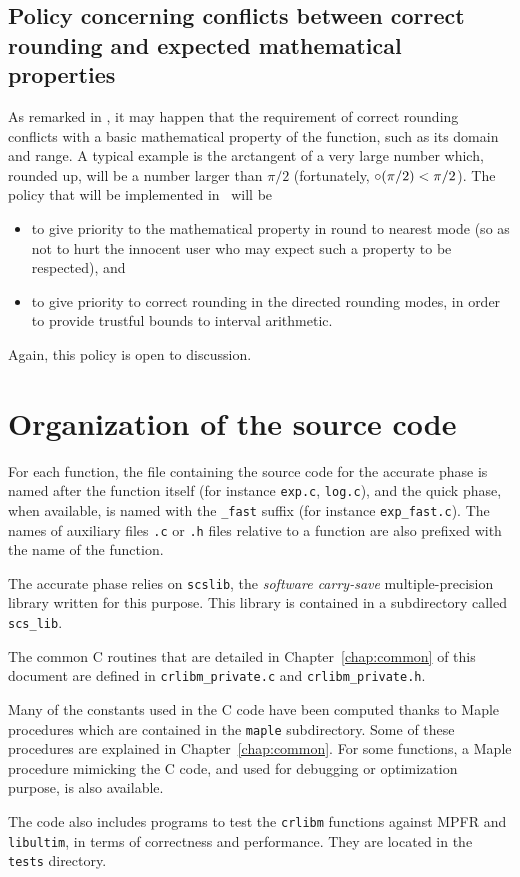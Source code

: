 \subsection{Policy concerning conflicts between correct rounding and
  expected mathematical properties}
As remarked in \cite{DefHanLefMulRevZim2004}, it may happen that the
requirement of correct rounding conflicts with a basic mathematical
property of the function, such as its domain and range. A typical
example is the arctangent of a very large number which, rounded up,
will be a number larger than $\pi/2$ (fortunately, $\circ(\pi/2) <
\pi/2$). The policy that will be implemented in \crlibm\ will be
\begin{itemize}
\item to give priority to the mathematical property in round to
  nearest mode (so as not to hurt the innocent user who may expect
  such a property to be respected), and 
\item to give priority to correct rounding in the directed rounding
  modes, in order to provide trustful bounds to interval arithmetic.
\end{itemize}

Again, this policy is open to discussion.

\section{Organization of the source code}

For each function, the file containing the source code for the
accurate phase is named after the function itself (for instance
\texttt{exp.c}, \texttt{log.c}), and the quick phase, when available,
is named with the \texttt{\_fast} suffix (for instance
\texttt{exp\_fast.c}). The names of auxiliary files \texttt{.c} or
\texttt{.h} files relative to a function are also prefixed with the
name of the function.

The accurate phase relies on \texttt{scslib}, the \emph{software
  carry-save} multiple-precision library written for this purpose.
This library is contained in a subdirectory called \texttt{scs\_lib}.

The common C routines that are detailed in Chapter~\ref{chap:common} of
this document are defined in \texttt{crlibm\_private.c} and
\texttt{crlibm\_private.h}.

Many of the constants used in the C code have been computed thanks to
Maple procedures which are contained in the \texttt{maple}
subdirectory. Some of these procedures are explained in
Chapter~\ref{chap:common}. For some functions, a Maple procedure
mimicking the C code, and used for debugging or optimization purpose,
is also available.


The code also includes programs to test the \texttt{crlibm} functions
against MPFR and \texttt{libultim}, in terms of correctness and
performance. They are located in the \texttt{tests} directory.

